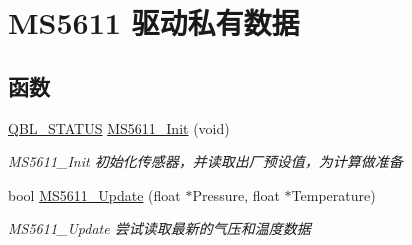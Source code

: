 \hypertarget{group__ms5611__driver__internal}{}\section{M\+S5611 驱动私有数据}
\label{group__ms5611__driver__internal}
\subsection*{函数}
\begin{DoxyCompactItemize}
\item 
\hyperlink{group__qbl_ga41526b685f55486191108499fe91c30b}{Q\+B\+L\+\_\+\+S\+T\+A\+T\+US} \hyperlink{group__ms5611__driver__internal_gad95cb9e2dfcda543ebc7ea207c652517}{M\+S5611\+\_\+\+Init} (void)
\begin{DoxyCompactList}\small\item\em M\+S5611\+\_\+\+Init 初始化传感器，并读取出厂预设值，为计算做准备 \end{DoxyCompactList}\item 
bool \hyperlink{group__ms5611__driver__internal_ga776a0112261b15cd6d234c77152b384a}{M\+S5611\+\_\+\+Update} (float $\ast$Pressure, float $\ast$Temperature)
\begin{DoxyCompactList}\small\item\em M\+S5611\+\_\+\+Update 尝试读取最新的气压和温度数据 \end{DoxyCompactList}\end{DoxyCompactItemize}
